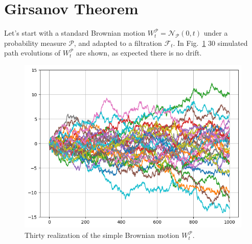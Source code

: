 \documentclass[12pt,a4paper]{article}
\begin{document}
%
%
%
%
%
%
%
%

\clearpage
\section{Girsanov Theorem}
Let’s start with a standard Brownian motion $W_t^{\mathcal{P}} = \mathcal{N}_{\mathcal{P}}(0,t)$ under a probability measure $\mathcal{P}$, and adapted to a filtration $\mathcal{F}_t$. In Fig.~\ref{fig:brownian_motion_nodrift} 30 simulated path evolutions of $W_t^{\mathcal{P}}$ are shown, as expected there is no drift.
	
\begin{figure}[htbp]
	\begin{center}
		\includegraphics[width=0.5\linewidth]{addons/brownian_motion_nodrift}
	\end{center}
	\label{fig:brownian_motion_nodrift}
	\caption{Thirty realization of the simple Brownian motion $W_t^{\mathcal{P}}$.}
\end{figure}
\end{document}
